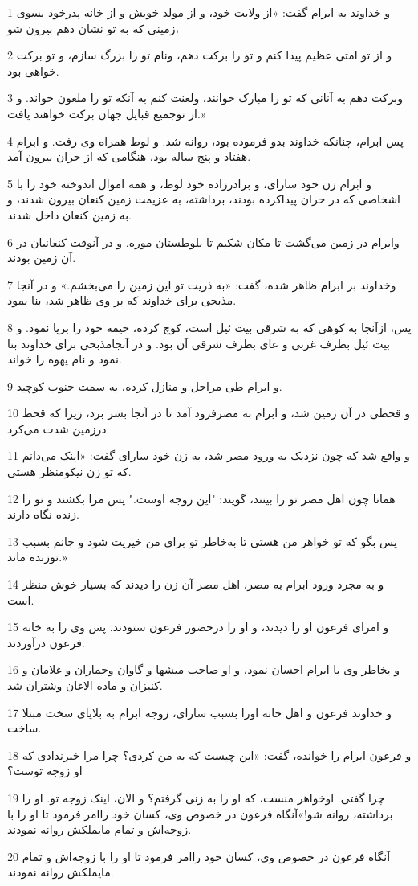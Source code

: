 \par 1 و خداوند به ابرام گفت: «از ولایت خود، و از مولد خویش و از خانه پدرخود بسوی زمینی که به تو نشان دهم بیرون شو،
\par 2 و از تو امتی عظیم پیدا کنم و تو را برکت دهم، ونام تو را بزرگ سازم، و تو برکت خواهی بود.
\par 3 وبرکت دهم به آنانی که تو را مبارک خوانند، ولعنت کنم به آنکه تو را ملعون خواند. و از توجمیع قبایل جهان برکت خواهند یافت.»
\par 4 پس ابرام، چنانکه خداوند بدو فرموده بود، روانه شد. و لوط همراه وی رفت. و ابرام هفتاد و پنج ساله بود، هنگامی که از حران بیرون آمد.
\par 5 و ابرام زن خود سارای، و برادرزاده خود لوط، و همه اموال اندوخته خود را با اشخاصی که در حران پیداکرده بودند، برداشته، به عزیمت زمین کنعان بیرون شدند، و به زمین کنعان داخل شدند.
\par 6 وابرام در زمین می‌گشت تا مکان شکیم تا بلوطستان موره. و در آنوقت کنعانیان در آن زمین بودند.
\par 7 وخداوند بر ابرام ظاهر شده، گفت: «به ذریت تو این زمین را می‌بخشم.» و در آنجا مذبحی برای خداوند که بر وی ظاهر شد، بنا نمود.
\par 8 پس، ازآنجا به کوهی که به شرقی بیت ئیل است، کوچ کرده، خیمه خود را برپا نمود. و بیت ئیل بطرف غربی و عای بطرف شرقی آن بود. و در آنجامذبحی برای خداوند بنا نمود و نام یهوه را خواند.
\par 9 و ابرام طی مراحل و منازل کرده، به سمت جنوب کوچید.
\par 10 و قحطی در آن زمین شد، و ابرام به مصرفرود آمد تا در آنجا بسر برد، زیرا که قحط درزمین شدت می‌کرد.
\par 11 و واقع شد که چون نزدیک به ورود مصر شد، به زن خود سارای گفت: «اینک می‌دانم که تو زن نیکومنظر هستی.
\par 12 همانا چون اهل مصر تو را بینند، گویند: "این زوجه اوست." پس مرا بکشند و تو را زنده نگاه دارند.
\par 13 پس بگو که تو خواهر من هستی تا به‌خاطر تو برای من خیریت شود و جانم بسبب توزنده ماند.» 
\par 14 و به مجرد ورود ابرام به مصر، اهل مصر آن زن را دیدند که بسیار خوش منظر است.
\par 15 و امرای فرعون او را دیدند، و او را درحضور فرعون ستودند. پس وی را به خانه فرعون در‌آوردند.
\par 16 و بخاطر وی با ابرام احسان نمود، و او صاحب میشها و گاوان وحماران و غلامان و کنیزان و ماده الاغان وشتران شد.
\par 17 و خداوند فرعون و اهل خانه اورا بسبب سارای، زوجه ابرام به بلایای سخت مبتلا ساخت.
\par 18 و فرعون ابرام را خوانده، گفت: «این چیست که به من کردی؟ چرا مرا خبرندادی که او زوجه توست؟
\par 19 چرا گفتی: اوخواهر منست، که او را به زنی گرفتم؟ و الان، اینک زوجه تو. او را برداشته، روانه شو!»آنگاه فرعون در خصوص وی، کسان خود راامر فرمود تا او را با زوجه‌اش و تمام مایملکش روانه نمودند.
\par 20 آنگاه فرعون در خصوص وی، کسان خود راامر فرمود تا او را با زوجه‌اش و تمام مایملکش روانه نمودند.
 
